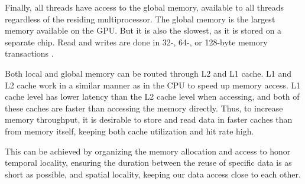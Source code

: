 Finally, all threads have access to the global memory, available to all threads regardless of the residing multiprocessor. The global memory is the largest memory available on the GPU. But it is also the slowest, as it is stored on a separate chip. Read and writes are done in 32-, 64-, or 128-byte memory transactions \cite{cudaprog}.

Both local and global memory can be routed through L2 and L1 cache. L1 and L2 cache work in a similar manner as in the CPU to speed up memory access. L1 cache level has lower latency than the L2 cache level when accessing, and both of these caches are faster than accessing the memory directly. Thus, to increase memory throughput, it is desirable to store and read data in faster caches than from memory itself, keeping both cache utilization and hit rate high.

This can be achieved by organizing the memory allocation and access to honor temporal locality, ensuring the duration between the reuse of specific data is as short as possible, and spatial locality, keeping our data access close to each other.

